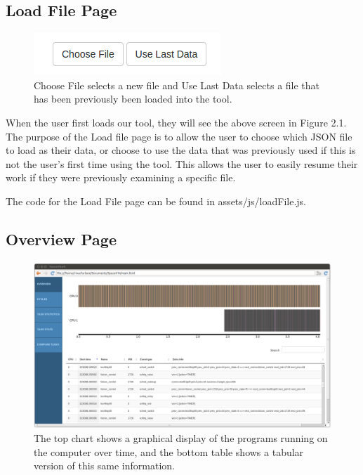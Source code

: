 \documentclass{hmcclinic}
\begin{document}
\subsection{Load File Page}

\begin{figure}[h!]
  \centering
      \includegraphics[scale=0.75]{loadFile-buttons.png}
  \caption{Choose File selects a new file and Use Last Data selects a file that has been previously been loaded into the tool.}
  \end{figure}

When the user first loads our tool, they will see the above screen in Figure 2.1. The purpose of the Load file page is to allow the user to choose which JSON file to load as their data, or choose to use the data that was previously used if this is not the user's first time using the tool. This allows the user to easily resume their work if they were previously examining a specific file.

The code for the Load File page can be found in assets/js/loadFile.js.

  \subsection{Overview Page} 
  
  \begin{figure}[h!]
  \centering
      \includegraphics[width=5in]{overview-page.png}
  \caption{The top chart shows a graphical display of the programs running on the computer over time, and the bottom table shows a tabular version of this same information.}
  \end{figure}
  
\end{document}

